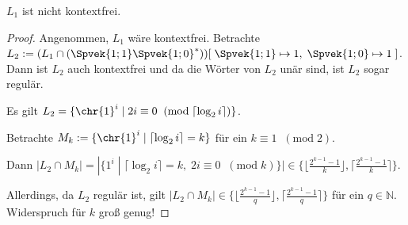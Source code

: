 \begin{satz} $L_1$ ist nicht kontextfrei.\end{satz}
\begin{proof}

    Angenommen, $L_1$ wäre kontextfrei.
    Betrachte $L_2 := (L_1 \cap (\Spvek{1; 1}\Spvek{1; 0}^*))[ \; \Spvek{1; 1} \mapsto 1, \; \Spvek{1; 0} \mapsto 1 \; ] $.
    Dann ist $L_2$ auch kontextfrei und da die Wörter von $L_2$ unär sind, ist $L_2$ sogar regulär.
    
    Es gilt $L_2 = \{ \chr{1}^i \; | \;  2i \equiv 0 \;\; (\mathrm{mod} \; {\lceil \log_2{i} \rceil }) \}$.
    
    Betrachte $M_k := \{ \chr{1}^i \; | \; \lceil \log_2{i} \rceil = k \}$ für ein $k \equiv 1 \;\; (\mathrm{mod} \; 2)$.
    
    
    Dann $| L_2 \cap M_k | = | \{ 1^i \; | \;  \lceil \log_2{i} \rceil = k, \;  2i \equiv 0 \;\; (\mathrm{mod} \; k) \} | \in \{ \lfloor \frac{2^{k-1}-1}{k} \rfloor, \lceil \frac{2^{k-1}-1}{k} \rceil \}$.
    
    Allerdings, da $L_2$ regulär ist, gilt $|L_2 \cap M_k| \in \{ \lfloor \frac{2^{k-1}-1}{q} \rfloor, \lceil \frac{2^{k-1}-1}{q} \rceil \}$ für ein $q \in \mathbb{N}$. Widerspruch für $k$ groß genug!
    
\end{proof}    


